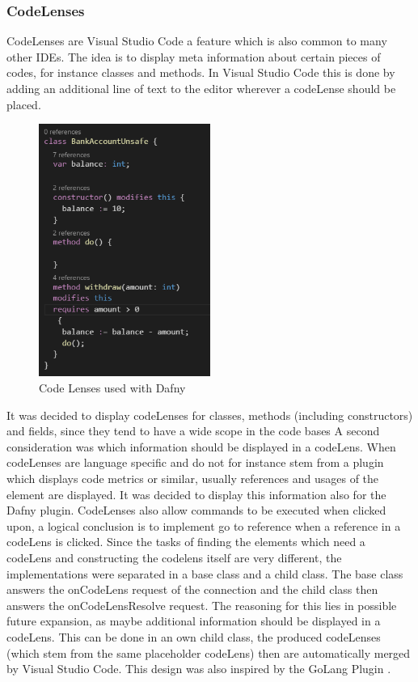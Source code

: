 \subsubsection{CodeLenses} \label{codelenses}
CodeLenses are Visual Studio Code a feature which is also common to many other IDEs. The idea is to display meta information about certain pieces of codes, for instance classes and methods. In Visual Studio Code this is done  by adding an additional line of text to the editor wherever a codeLense should  be placed. \newline
\begin{figure}[H]
	\centering
	\includegraphics[width=0.5\textwidth]{img/codelensesClosed}
	\caption{Code Lenses used with Dafny}
	\label{fig:codelensesclosed}
\end{figure}
It was decided to display codeLenses for classes, methods (including constructors) and fields, since they tend to have a wide scope in the code bases \newline
A second consideration was which information should be displayed in a codeLens. When codeLenses are language specific and do not for instance stem from a plugin which displays code metrics or similar, usually references and usages of the element are displayed. It was decided to display this information also for the Dafny plugin. CodeLenses also allow commands to be executed when clicked upon, a logical conclusion is to implement go to reference when a reference in a codeLens is clicked.\newline
Since the tasks of finding the elements which need a codeLens and constructing the codelens itself are very different, the implementations were separated in a base class and a child class. The base class answers the onCodeLens request of the connection and the child class then answers the onCodeLensResolve request. The reasoning for this lies in possible future expansion, as maybe additional information should be displayed in a codeLens. This can be done in an own child class, the produced codeLenses (which stem from the same placeholder codeLens) then are automatically merged by Visual Studio Code. This design was also inspired by the GoLang Plugin \cite{godef}. 
